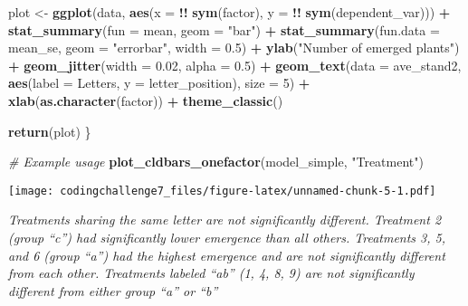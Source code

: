 \documentclass[
]{article}
\newenvironment{Shaded}{\begin{snugshade}}{\end{snugshade}}
\newcommand{\AttributeTok}[1]{\textcolor[rgb]{0.13,0.29,0.53}{#1}}
\newcommand{\CommentTok}[1]{\textcolor[rgb]{0.56,0.35,0.01}{\textit{#1}}}
\newcommand{\DecValTok}[1]{\textcolor[rgb]{0.00,0.00,0.81}{#1}}
\newcommand{\FloatTok}[1]{\textcolor[rgb]{0.00,0.00,0.81}{#1}}
\newcommand{\FunctionTok}[1]{\textcolor[rgb]{0.13,0.29,0.53}{\textbf{#1}}}
\newcommand{\NormalTok}[1]{#1}
\newcommand{\OtherTok}[1]{\textcolor[rgb]{0.56,0.35,0.01}{#1}}
\newcommand{\SpecialCharTok}[1]{\textcolor[rgb]{0.81,0.36,0.00}{\textbf{#1}}}
\newcommand{\StringTok}[1]{\textcolor[rgb]{0.31,0.60,0.02}{#1}}
\begin{document}
\begin{Shaded}
\begin{Highlighting}[]
\NormalTok{  plot }\OtherTok{\textless{}{-}} \FunctionTok{ggplot}\NormalTok{(data, }\FunctionTok{aes}\NormalTok{(}\AttributeTok{x =} \SpecialCharTok{!!} \FunctionTok{sym}\NormalTok{(factor), }\AttributeTok{y =} \SpecialCharTok{!!} \FunctionTok{sym}\NormalTok{(dependent\_var))) }\SpecialCharTok{+} 
    \FunctionTok{stat\_summary}\NormalTok{(}\AttributeTok{fun =}\NormalTok{ mean, }\AttributeTok{geom =} \StringTok{"bar"}\NormalTok{) }\SpecialCharTok{+}
    \FunctionTok{stat\_summary}\NormalTok{(}\AttributeTok{fun.data =}\NormalTok{ mean\_se, }\AttributeTok{geom =} \StringTok{"errorbar"}\NormalTok{, }\AttributeTok{width =} \FloatTok{0.5}\NormalTok{) }\SpecialCharTok{+}
    \FunctionTok{ylab}\NormalTok{(}\StringTok{"Number of emerged plants"}\NormalTok{) }\SpecialCharTok{+} 
    \FunctionTok{geom\_jitter}\NormalTok{(}\AttributeTok{width =} \FloatTok{0.02}\NormalTok{, }\AttributeTok{alpha =} \FloatTok{0.5}\NormalTok{) }\SpecialCharTok{+}
    \FunctionTok{geom\_text}\NormalTok{(}\AttributeTok{data =}\NormalTok{ ave\_stand2, }\FunctionTok{aes}\NormalTok{(}\AttributeTok{label =}\NormalTok{ Letters, }\AttributeTok{y =}\NormalTok{ letter\_position), }\AttributeTok{size =} \DecValTok{5}\NormalTok{) }\SpecialCharTok{+}
    \FunctionTok{xlab}\NormalTok{(}\FunctionTok{as.character}\NormalTok{(factor)) }\SpecialCharTok{+}
    \FunctionTok{theme\_classic}\NormalTok{()}
  
  \FunctionTok{return}\NormalTok{(plot)}
\NormalTok{\}}

\CommentTok{\# Example usage}
\FunctionTok{plot\_cldbars\_onefactor}\NormalTok{(model\_simple, }\StringTok{"Treatment"}\NormalTok{)}
\end{Highlighting}
\end{Shaded}

\texttt{[image: codingchallenge7\_files/figure-latex/unnamed-chunk-5-1.pdf]}

\emph{Treatments sharing the same letter are not significantly
different. Treatment 2 (group ``c'') had significantly lower emergence
than all others. Treatments 3, 5, and 6 (group ``a'') had the highest
emergence and are not significantly different from each other.
Treatments labeled ``ab'' (1, 4, 8, 9) are not significantly different
from either group ``a'' or ``b''}
\end{document}
